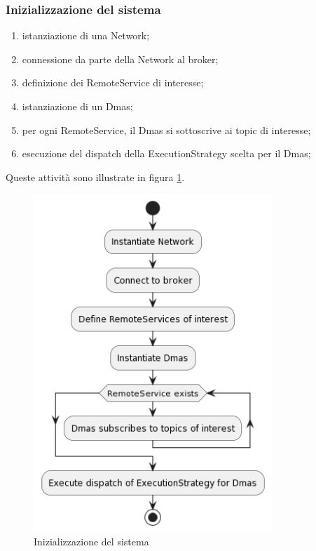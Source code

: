 \subsubsection{Inizializzazione del sistema}

\begin{enumerate}
    \item istanziazione di una Network;
    \item connessione da parte della Network al broker;
    \item definizione dei RemoteService di interesse;
    \item istanziazione di un Dmas;
    \item per ogni RemoteService, il Dmas si sottoscrive ai topic di interesse;
    \item esecuzione del dispatch della ExecutionStrategy scelta per il Dmas;
\end{enumerate}

Queste attività sono illustrate in figura \ref{fig:initialization}.

\begin{figure}
    \centering
    \includegraphics[width=0.8\textwidth]{figures/activity-dmas.png}
    \caption{Inizializzazione del sistema}
    \label{fig:initialization}
\end{figure}

